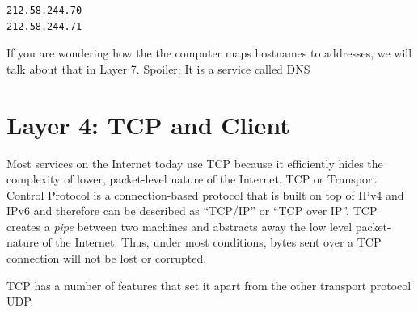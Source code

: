 \begin{lstlisting}
212.58.244.70
212.58.244.71
\end{lstlisting}

If you are wondering how the the computer maps \gls{hostnames} to addresses, we will talk about that in Layer 7.
Spoiler: It is a service called \gls{DNS}

\section{Layer 4: TCP and Client}

Most services on the Internet today use \gls{TCP} because it efficiently hides the complexity of lower, packet-level nature of the Internet.
TCP or Transport Control Protocol is a connection-based protocol that is built on top of IPv4 and IPv6 and therefore can be described as ``TCP/IP'' or ``TCP over IP''.
TCP creates a \emph{pipe} between two machines and abstracts away the low level packet-nature of the Internet. Thus, under most conditions, bytes sent over a TCP connection will not be lost or corrupted.

TCP has a number of features that set it apart from the other transport protocol UDP.


